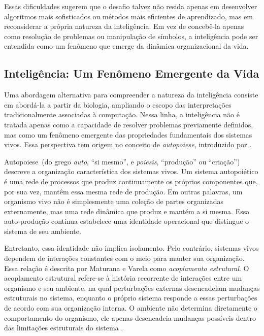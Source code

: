 Essas dificuldades sugerem que o desafio talvez não resida apenas em desenvolver algoritmos mais sofisticados ou métodos mais eficientes de aprendizado, mas em reconsiderar a própria natureza da inteligência. Em vez de concebê-la apenas como resolução de problemas ou manipulação de símbolos, a inteligência pode ser entendida como um fenômeno que emerge da dinâmica organizacional da vida.

\subsection{Inteligência: Um Fenômeno Emergente da Vida}
\label{subsec:inteligencia-fenomeno-emergente-vida}

Uma abordagem alternativa para compreender a natureza da inteligência consiste em abordá-la a partir da biologia, ampliando o escopo das interpretações tradicionalmente associadas à computação.
Nessa linha, a inteligência não é tratada apenas como a capacidade de resolver problemas previamente definidos, mas como um fenômeno emergente das propriedades fundamentais dos sistemas vivos. Essa perspectiva tem origem no conceito de \textit{autopoiese}, introduzido por .

Autopoiese\ (do grego \textit{auto}, ``si mesmo'', e \textit{poiesis}, ``produção'' ou ``criação'') descreve a organização característica dos sistemas vivos. Um sistema autopoiético é uma rede de processos que produz continuamente os próprios componentes que, por sua vez, mantêm essa mesma rede de produção. Em outras palavras, um organismo vivo não é simplesmente uma coleção de partes organizadas externamente, mas uma rede dinâmica que produz e mantém a si mesma. Essa auto-produção contínua estabelece uma identidade operacional que distingue o sistema de seu ambiente.

Entretanto, essa identidade não implica isolamento. Pelo contrário, sistemas vivos dependem de interações constantes com o meio para manter sua organização. Essa relação é descrita por Maturana e Varela como \textit{acoplamento estrutural}. O acoplamento estrutural refere-se à história recorrente de interações entre um organismo e seu ambiente, na qual perturbações externas desencadeiam mudanças estruturais no sistema, enquanto o próprio sistema responde a essas perturbações de acordo com sua organização interna. O ambiente não determina diretamente o comportamento do organismo, ele apenas desencadeia mudanças possíveis dentro das limitações estruturais do sistema \cite{varela1991intentionality}.

